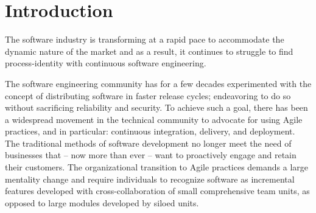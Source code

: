 \documentclass[12pt,a4paper]{article}
\begin{document}

\newpage
\section{Introduction}
The software industry is transforming at a rapid pace to accommodate the dynamic nature of the market and as a result, it continues to struggle to find process-identity with continuous software engineering.

The software engineering community has for a few decades experimented with the concept of distributing software in faster release cycles; endeavoring to do so without sacrificing reliability and security. To achieve such a goal, there has been a widespread movement in the technical community to advocate for using Agile practices, and in particular: continuous integration, delivery, and deployment. The traditional methods of software development no longer meet the need of businesses that -- now more than ever -- want to proactively engage and retain their customers. The organizational transition to Agile practices demands a large mentality change and require individuals to recognize software as incremental features developed with cross-collaboration of small comprehensive team units, as opposed to large modules developed by siloed units.
\end{document}
